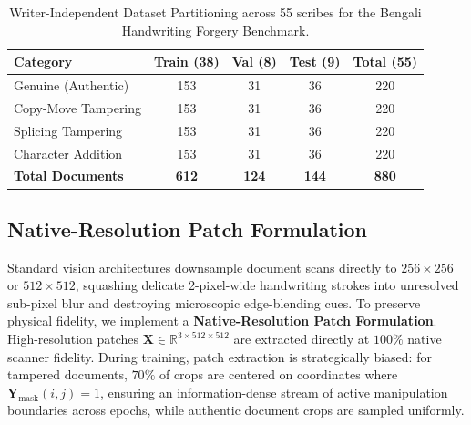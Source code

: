 \documentclass[runningheads]{llncs}
\begin{document}
\begin{table}[ht]
\caption{Writer-Independent Dataset Partitioning across 55 scribes for the Bengali Handwriting Forgery Benchmark.}\label{tab:dataset_split}
\centering
\setlength{\tabcolsep}{6pt}
\begin{tabular}{lcccc}
\toprule
\textbf{Category} & \textbf{Train (38)} & \textbf{Val (8)} & \textbf{Test (9)} & \textbf{Total (55)} \\
\midrule
Genuine (Authentic)    & 153 & 31 & 36 & 220 \\
Copy-Move Tampering    & 153 & 31 & 36 & 220 \\
Splicing Tampering     & 153 & 31 & 36 & 220 \\
Character Addition     & 153 & 31 & 36 & 220 \\
\midrule
\textbf{Total Documents} & \textbf{612} & \textbf{124} & \textbf{144} & \textbf{880} \\
\bottomrule
\end{tabular}
\end{table}

\subsection{Native-Resolution Patch Formulation}\label{subsec3_3}
Standard vision architectures downsample document scans directly to $256 \times 256$ or $512 \times 512$, squashing delicate 2-pixel-wide handwriting strokes into unresolved sub-pixel blur and destroying microscopic edge-blending cues. To preserve physical fidelity, we implement a \textbf{Native-Resolution Patch Formulation}. High-resolution patches $\mathbf{X} \in \mathbb{R}^{3 \times 512 \times 512}$ are extracted directly at $100\%$ native scanner fidelity. During training, patch extraction is strategically biased: for tampered documents, $70\%$ of crops are centered on coordinates where $\mathbf{Y}_{\text{mask}}(i, j) = 1$, ensuring an information-dense stream of active manipulation boundaries across epochs, while authentic document crops are sampled uniformly.
\end{document}

